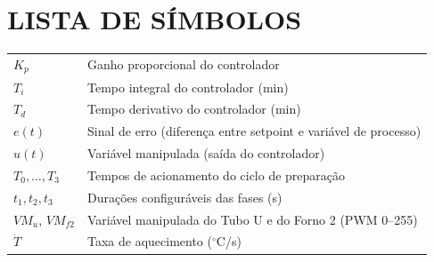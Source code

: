 \documentclass[12pt,a4paper,openright,oneside]{memoir}
\numberwithin{equation}{chapter}
\begin{document}
\chapter*{LISTA DE SÍMBOLOS}
\begin{tabular}{@{}p{4.2cm}p{11cm}@{}}
$K_p$    & Ganho proporcional do controlador\\
$T_i$    & Tempo integral do controlador (min)\\
$T_d$    & Tempo derivativo do controlador (min)\\
$e(t)$   & Sinal de erro (diferença entre setpoint e variável de processo)\\
$u(t)$   & Variável manipulada (saída do controlador)\\
$T_0,\dots,T_3$ & Tempos de acionamento do ciclo de preparação\\
$t_1,t_2,t_3$   & Durações configuráveis das fases (s)\\
$VM_u$, $VM_{f2}$ & Variável manipulada do Tubo U e do Forno 2 (PWM 0--255)\\
$\dot{T}$ & Taxa de aquecimento ($^{\circ}$C/s)\\
\end{tabular}
\clearpage

\renewcommand{\contentsname}{SUMÁRIO}
\tableofcontents*
\clearpage

\mainmatter








\clearpage
\renewcommand{\bibname}{REFERÊNCIAS}
\renewcommand{\bibsection}{%
  \chapter*{\bibname}%
  \addcontentsline{toc}{chapter}{REFERÊNCIAS}}



\appendix

\end{document}
